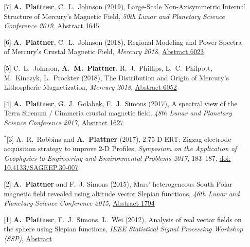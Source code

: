 \documentclass[10pt]{article}
\begin{document}
\spcp
\hspace{-0.5cm}[7] \textbf{A.~Plattner}, C.~L.~Johnson (2019), Large-Scale Non-Axisymmetric Internal Structure of Mercury's Magnetic Field,
\emph{50th Lunar and Planetary Science Conference 2019},
\href{https://www.hou.usra.edu/meetings/lpsc2019/pdf/1645.pdf}{Abstract 1645}


\spcp
\hspace{-0.5cm}[6] \textbf{A.~Plattner}, C.~L.~Johnson (2018),
Regional Modeling and Power Spectra of Mercury's Crustal Magnetic Field,
\emph{Mercury 2018},
\href{https://www.hou.usra.edu/meetings/mercury2018/pdf/6023.pdf}{Abstract 6023}

\spcp
\hspace{-0.5cm}[5] C.~L.~Johnson,
\textbf{A.~M.~Plattner}. R.~J.~Phillips, L.~C.~Philpott, M.~Kinczyk,
L.~Prockter (2018), The Distribution and Origin of Mercury's Lithospheric Magnetization, \emph{Mercury 2018},
\href{https://www.hou.usra.edu/meetings/mercury2018/pdf/6052.pdf}{Abstract
  6052}

\spcp
\hspace{-0.5cm}[4] \textbf{A.~Plattner}, G.~J.~Golabek, F.~J.~Simons (2017),
A spectral view of the Terra Sirenum / Cimmeria crustal magnetic
field,
\emph{48th Lunar and Planetary Science Conference 2017},
\href{http://www.lpi.usra.edu/meetings/lpsc2017/pdf/1627.pdf}{Abstract 1627}

\spcp
\hspace{-0.67cm}$^*$[3] A.~R.~Robbins and \textbf{A.~Plattner}
(2017),
2.75-D ERT: Zigzag electrode acquisition strategy to improve 2-D
Profiles,
\emph{Symposium on the Application of Geophysics to Engineering and
  Environmental Problems 2017}, 183--187,
\href{http://library.seg.org/doi/pdf/10.4133/SAGEEP.30-007}{doi: 10.4133/SAGEEP.30-007}

\spcp
\hspace{-0.5cm}[2] \textbf{A.~Plattner} and F.~J. Simons (2015),
Mars' heterogeneous South Polar magnetic field revealed using altitude vector Slepian functions,
\emph{46th Lunar and Planetary Science Conference 2015},
\href{http://www.hou.usra.edu/meetings/lpsc2015/pdf/1794.pdf}{Abstract 1794}

\spcp
\hspace{-0.5cm}[1] \textbf{A.~Plattner}, F.~J.~Simons, L.~Wei (2012),
Analysis of real vector fields on the sphere using Slepian functions,
\emph{IEEE Statistical Signal Processing Workshop (SSP)},
\href{http://ieeexplore.ieee.org/stamp/stamp.jsp?tp=&arnumber=6319659}{Abstract}
\end{document}

